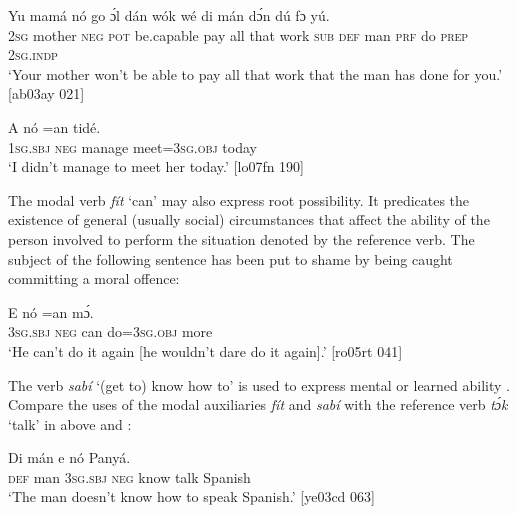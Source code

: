 \ea%
    \label{ex:key:407}
    \gll Yu  mamá  nó  go        ɔ́l  dán    wók    
wé  di  mán dɔ́n  dú  fɔ  yú.\\
\textsc{2sg}  mother  \textsc{neg}  \textsc{pot}  be.capable  pay  all  that    work  
\textsc{sub}  \textsc{def}  man \textsc{prf}  do  \textsc{prep}  \textsc{2sg.indp}\\

\glt ‘Your mother won’t be able to pay all that work that the man has done 
for you.’ [ab03ay 021]
\z


\ea%
    \label{ex:key:408}
    \gll \MakeUppercase{A}   nó    =an    tidé.\\
\textsc{1sg.sbj}  \textsc{neg}  manage  meet=\textsc{3sg.obj}  today\\

\glt ‘I didn’t manage to meet her today.’ [lo07fn 190]
\z

The modal verb \textit{fít} ‘can’ may also express root possibility. It predicates the existence of general (usually social) circumstances that affect the ability of the person involved to perform the situation denoted by the reference verb. The subject of the following sentence has been put to shame by being caught committing a moral offence: 


\ea%
    \label{ex:key:409}
    \gll E    nó    =an    mɔ́.\\
\textsc{3sg.sbj}  \textsc{neg}  can  do=\textsc{3sg.obj}  more\\

\glt ‘He can’t do it again [he wouldn’t dare do it again].’ [ro05rt 041]
\z

The verb \textit{sabí} ‘(get to) know how to’ is used to express mental or learned ability . Compare the uses of the modal auxiliaries \textit{fít} and \textit{sabí} with the reference verb \textit{tɔ́k} ‘talk’ in  above and :


\ea%
    \label{ex:key:410}
    \gll Di  mán    e    nó        Panyá.\\
\textsc{def}  man    \textsc{3sg.sbj}  \textsc{neg}  know  talk  Spanish\\

\glt ‘The man doesn’t know how to speak Spanish.’ [ye03cd 063]
\z

